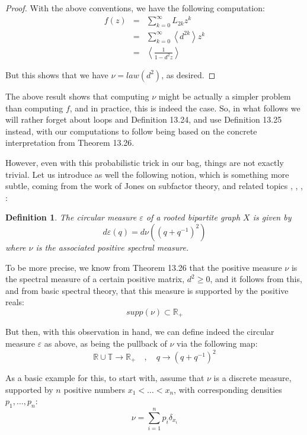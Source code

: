 \documentclass[12pt]{amsbook}
\newtheorem{definition}[theorem]{Definition}
\begin{document}
\begin{proof}
With the above conventions, we have the following computation:
\begin{eqnarray*}
f(z)
&=&\sum_{k=0}^\infty L_{2k}z^k\\
&=&\sum_{k=0}^\infty\left<d^{2k}\right>z^k\\
&=&\left<\frac{1}{1-d^2z}\right>
\end{eqnarray*}

But this shows that we have $\nu=law(d^2)$, as desired.
\end{proof}

The above result shows that computing $\nu$ might be actually a simpler problem than computing $f$, and in practice, this is indeed the case. So, in what follows we will rather forget about loops and Definition 13.24, and use Definition 13.25 instead, with our computations to follow being based on the concrete interpretation from Theorem 13.26.

\bigskip

However, even with this probabilistic trick in our bag, things are not exactly trivial. Let us introduce as well the following notion, which is something more subtle, coming from the work of Jones on subfactor theory, and related topics \cite{jo1}, \cite{jo2}, \cite{jo3}, \cite{jo4}:


\begin{definition}
The circular measure $\varepsilon$ of a rooted bipartite graph $X$ is given by
$$d\varepsilon(q)=d\nu((q+q^{-1})^2)$$
where $\nu$ is the associated positive spectral measure.
\end{definition}

To be more precise, we know from Theorem 13.26 that the positive measure $\nu$ is the spectral measure of a certain positive matrix, $d^2\geq0$, and it follows from this, and from basic spectral theory, that this measure is supported by the positive reals:
$$supp(\nu)\subset\mathbb R_+$$

But then, with this observation in hand, we can define indeed the circular measure $\varepsilon$ as above, as being the pullback of $\nu$ via the following map:
$$\mathbb R\cup\mathbb T\to\mathbb R_+\quad,\quad 
q\to (q+q^{-1})^2$$

As a basic example for this, to start with, assume that $\nu$ is a discrete measure, supported by $n$ positive numbers $x_1<\ldots<x_n$, with corresponding densities $p_1,\ldots,p_n$:
$$\nu=\sum_{i=1}^n p_i\delta_{x_i}$$
\end{document}
